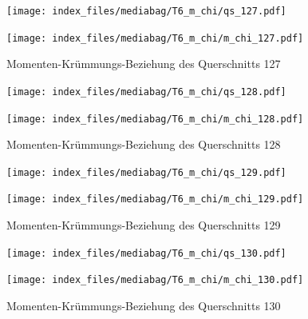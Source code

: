 \documentclass[
  11pt,
  letterpaper,
]{scrreprt}
\begin{document}
\begin{figure}[H]

\begin{minipage}{0.50\linewidth}
\texttt{[image: index\_files/mediabag/T6\_m\_chi/qs\_127.pdf]}\end{minipage}%
%
\begin{minipage}{0.50\linewidth}
\texttt{[image: index\_files/mediabag/T6\_m\_chi/m\_chi\_127.pdf]}\end{minipage}%

\caption{\label{fig-m_chi_appendix}Momenten-Krümmungs-Beziehung des
Querschnitts 127}

\end{figure}%

\begin{figure}[H]

\begin{minipage}{0.50\linewidth}
\texttt{[image: index\_files/mediabag/T6\_m\_chi/qs\_128.pdf]}\end{minipage}%
%
\begin{minipage}{0.50\linewidth}
\texttt{[image: index\_files/mediabag/T6\_m\_chi/m\_chi\_128.pdf]}\end{minipage}%

\caption{\label{fig-m_chi_appendix}Momenten-Krümmungs-Beziehung des
Querschnitts 128}

\end{figure}%

\begin{figure}[H]

\begin{minipage}{0.50\linewidth}
\texttt{[image: index\_files/mediabag/T6\_m\_chi/qs\_129.pdf]}\end{minipage}%
%
\begin{minipage}{0.50\linewidth}
\texttt{[image: index\_files/mediabag/T6\_m\_chi/m\_chi\_129.pdf]}\end{minipage}%

\caption{\label{fig-m_chi_appendix}Momenten-Krümmungs-Beziehung des
Querschnitts 129}

\end{figure}%

\begin{figure}[H]

\begin{minipage}{0.50\linewidth}
\texttt{[image: index\_files/mediabag/T6\_m\_chi/qs\_130.pdf]}\end{minipage}%
%
\begin{minipage}{0.50\linewidth}
\texttt{[image: index\_files/mediabag/T6\_m\_chi/m\_chi\_130.pdf]}\end{minipage}%

\caption{\label{fig-m_chi_appendix}Momenten-Krümmungs-Beziehung des
Querschnitts 130}

\end{figure}%
\end{document}
